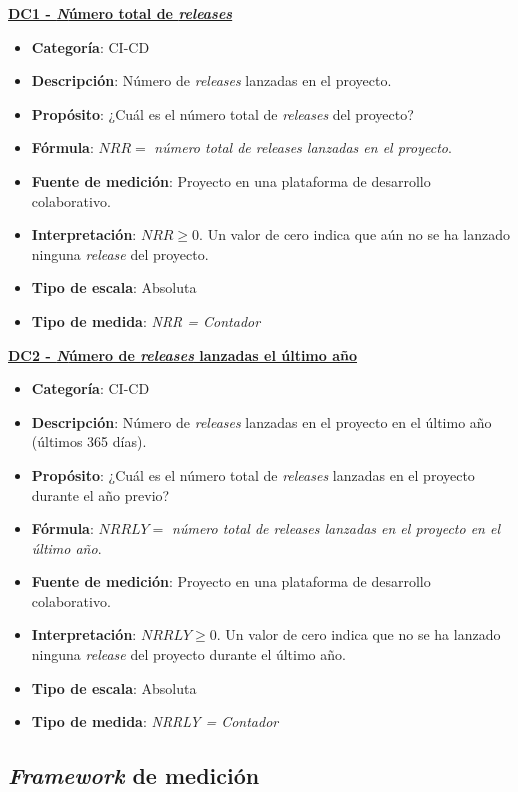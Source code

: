 \textbf{\underline{DC1 - \textit Número total de \textit{releases}}}
\begin{itemize}
	\item \textbf{Categoría}: CI-CD
	\item \textbf{Descripción}: Número de \textit{releases} lanzadas en el proyecto.
	\item \textbf{Propósito}: ¿Cuál es el número total de \textit{releases} del  proyecto?
	\item \textbf{Fórmula}: $NRR =$ \textit{número total de releases lanzadas en el proyecto}.
	\item \textbf{Fuente de medición}: Proyecto en una plataforma de desarrollo colaborativo.
	\item \textbf{Interpretación}: $NRR \geq 0$. Un valor de cero indica que aún no se ha lanzado ninguna \textit{release} del proyecto.
	\item \textbf{Tipo de escala}: Absoluta
	\item \textbf{Tipo de medida}: \textit{NRR = Contador}
\end{itemize}

\textbf{\underline{DC2 - \textit Número de \textit{releases} lanzadas el último año}}
\begin{itemize}
	\item \textbf{Categoría}: CI-CD
	\item \textbf{Descripción}: Número de \textit{releases} lanzadas en el proyecto en el último año (últimos 365 días).
	\item \textbf{Propósito}: ¿Cuál es el número total de \textit{releases} lanzadas en el proyecto durante el año previo?
	\item \textbf{Fórmula}: $NRRLY =$ \textit{número total de releases lanzadas en el proyecto en el último año}.
	\item \textbf{Fuente de medición}: Proyecto en una plataforma de desarrollo colaborativo.
	\item \textbf{Interpretación}: $NRRLY \geq 0$. Un valor de cero indica que no se ha lanzado ninguna \textit{release} del proyecto durante el último año.
	\item \textbf{Tipo de escala}: Absoluta
	\item \textbf{Tipo de medida}: \textit{NRRLY = Contador}
\end{itemize}



\subsection{\textit{Framework} de medición}\label{sect:3_3_3_FrameworkMedicion}


